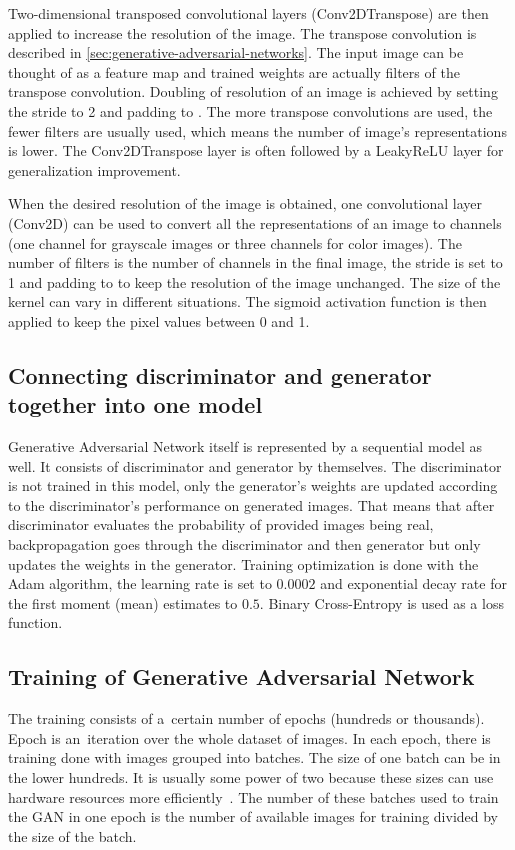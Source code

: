 Two-dimensional transposed convolutional layers (Conv2DTranspose) are then applied to increase the resolution of the image. The transpose convolution is described in \autoref{sec:generative-adversarial-networks}. The input image can be thought of as a feature map and trained weights are actually filters of the transpose convolution. Doubling of resolution of an image is achieved by setting the stride to 2 and padding to . The more transpose convolutions are used, the fewer filters are usually used, which means the number of image's representations is lower. The Conv2DTranspose layer is often followed by a LeakyReLU layer for generalization improvement.

When the desired resolution of the image is obtained, one convolutional layer (Conv2D) can be used to convert all the representations of an image to channels (one channel for grayscale images or three channels for color images). The number of filters is the number of channels in the final image, the stride is set to 1 and padding to  to keep the resolution of the image unchanged. The size of the kernel can vary in different situations. The sigmoid activation function is then applied to keep the pixel values between 0 and 1.

\subsection*{Connecting discriminator and generator together into one model}
Generative Adversarial Network itself is represented by a sequential model as well. It consists of discriminator and generator by themselves. The discriminator is not trained in this model, only the generator's weights are updated according to the discriminator's performance on generated images. That means that after discriminator evaluates the probability of provided images being real, backpropagation goes through the discriminator and then generator but only updates the weights in the generator. Training optimization is done with the Adam algorithm, the learning rate is set to $0.0002$ and exponential decay rate for the first moment (mean) estimates to $0.5$. Binary Cross-Entropy is used as a loss function.

\subsection*{Training of Generative Adversarial Network}
The training consists of a~certain number of epochs (hundreds or thousands). Epoch is an~iteration over the whole dataset of images. In each epoch, there is training done with images grouped into batches. The size of one batch can be in the lower hundreds. It is usually some power of two because these sizes can use hardware resources more efficiently~\cite{Goodfellow-et-al-2016}. The number of these batches used to train the GAN in one epoch is the number of available images for training divided by the size of the batch.

